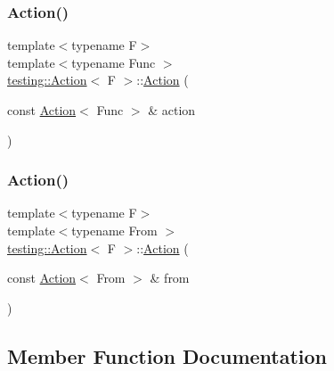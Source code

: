 \subsubsection{\texorpdfstring{Action()}{Action()}\hspace{0.1cm}{\footnotesize\ttfamily [3/4]}}
{\footnotesize\ttfamily template$<$typename F$>$ \\
template$<$typename Func $>$ \\
\mbox{\hyperlink{classtesting_1_1Action}{testing\+::\+Action}}$<$ F $>$\+::\mbox{\hyperlink{classtesting_1_1Action}{Action}} (\begin{DoxyParamCaption}\item[{const \mbox{\hyperlink{classtesting_1_1Action}{Action}}$<$ Func $>$ \&}]{action }\end{DoxyParamCaption})\hspace{0.3cm}{\ttfamily [explicit]}}

\mbox{\label{classtesting_1_1Action_af23eef2fff5a92d8ff2ed7ac7a542005}} 
\subsubsection{\texorpdfstring{Action()}{Action()}\hspace{0.1cm}{\footnotesize\ttfamily [4/4]}}
{\footnotesize\ttfamily template$<$typename F$>$ \\
template$<$typename From $>$ \\
\mbox{\hyperlink{classtesting_1_1Action}{testing\+::\+Action}}$<$ F $>$\+::\mbox{\hyperlink{classtesting_1_1Action}{Action}} (\begin{DoxyParamCaption}\item[{const \mbox{\hyperlink{classtesting_1_1Action}{Action}}$<$ From $>$ \&}]{from }\end{DoxyParamCaption})}



\subsection{Member Function Documentation}
\mbox{\label{classtesting_1_1Action_a4468ca2ea5e9f7363271145992d09dba}} 
